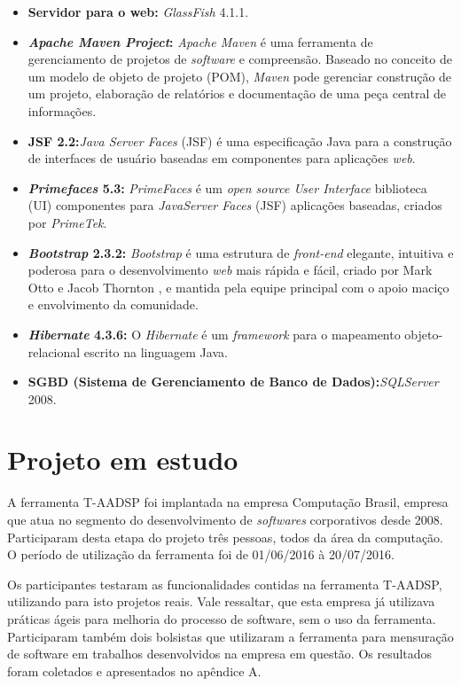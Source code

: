 \documentclass{acm_proc_article-sp}
\begin{document}
\begin{itemize}
\item \textbf{Servidor para o web:} \textit{GlassFish} 4.1.1. 
\item \textbf{\textit{Apache Maven Project}:} \textit{Apache Maven} é uma ferramenta de gerenciamento de projetos de \textit{software} e compreensão. Baseado no conceito de um modelo de objeto de projeto (POM), \textit{Maven} pode gerenciar construção de um projeto, elaboração de relatórios e documentação de uma peça central de informações.
\item \textbf{JSF 2.2:}\textit{Java Server Faces} (JSF) é uma especificação Java para a construção de interfaces de usuário baseadas em componentes para aplicações \textit{web}.
\item \textbf{\textit{Primefaces} 5.3:} \textit{PrimeFaces} é um \textit{open source User Interface} biblioteca (UI) componentes para \textit{JavaServer Faces} (JSF) aplicações baseadas, criados por \textit{PrimeTek}.  
\item \textbf{\textit{Bootstrap} 2.3.2:} \textit{Bootstrap} é uma estrutura de \textit{front-end} elegante, intuitiva e poderosa para o desenvolvimento \textit{web} mais rápida e fácil, criado por Mark Otto e Jacob Thornton , e mantida pela equipe principal com o apoio maciço e envolvimento da comunidade. 
\item \textbf{\textit{Hibernate} 4.3.6:} O \textit{Hibernate} é um \textit{framework} para o mapeamento objeto-relacional escrito na linguagem Java. 
\item \textbf{SGBD (Sistema de Gerenciamento de Banco de Dados):}\textit{SQLServer} 2008. 
\end{itemize}


\section{Projeto em estudo}
A ferramenta T-AADSP foi implantada na empresa Computação Brasil, empresa que atua no segmento do desenvolvimento de \textit{softwares} corporativos desde 2008. Participaram desta etapa do projeto três pessoas, todos da área da computação. O período de utilização da ferramenta foi de 01/06/2016 à 20/07/2016. 

Os participantes testaram as funcionalidades contidas na ferramenta T-AADSP, utilizando para isto projetos reais. Vale ressaltar, que esta empresa já utilizava práticas ágeis para melhoria do processo de software, sem o uso da ferramenta. Participaram também dois bolsistas que utilizaram a ferramenta para mensuração de software em trabalhos desenvolvidos na empresa em questão. Os resultados foram coletados e apresentados no apêndice A. 
\end{document}
